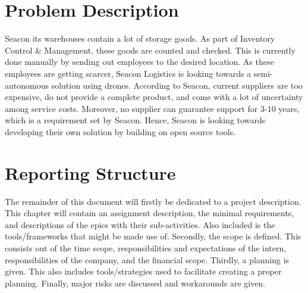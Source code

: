 \section{Problem Description}
\label{sec:problem_desc}
Seacon its warehouses contain a lot of storage goods. As part of Inventory Control \& Management, these goods are counted and checked. This is currently done manually by sending out employees to the desired location. As these employees are getting scarcer, Seacon Logistics is looking towards a semi-autonomous solution using drones. According to Seacon, current suppliers are too expensive, do not provide a complete product, and come with a lot of uncertainty among service costs. Moreover, no supplier can guarantee support for 3-10 years, which is a requirement set by Seacon. Hence, Seacon is looking towards developing their own solution by building on open source tools.

\section{Reporting Structure}
\label{sec:structure}
The remainder of this document will firstly be dedicated to a project description. This chapter will contain an assignment description, the minimal requirements, and descriptions of the epics with their sub-activities. Also included is the tools/frameworks that might be made use of. Secondly, the scope is defined. This consists out of the time scope, responsibilities and expectations of the intern, responsibilities of the company, and the financial scope. Thirdly, a planning is given. This also includes tools/strategies used to facilitate creating a proper planning. Finally, major risks are discussed and workarounds are given.